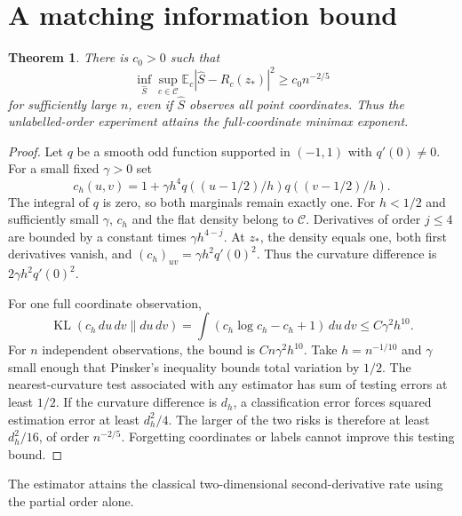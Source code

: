 \documentclass[11pt]{article}
\newtheorem{theorem}{Theorem}[section]
\theoremstyle{remark}
\newcommand{\E}{\mathbb E}
\newcommand{\KL}{\operatorname{KL}}
\newcommand{\calC}{\mathcal C}
\numberwithin{equation}{section}
\begin{document}
\section{A matching information bound}
\begin{theorem}\label{thm:lower}
There is $c_0>0$ such that
\[
 \inf_{\widehat S}\sup_{c\in\calC}
       \E_c|\widehat S-R_c(z_*)|^2\ge c_0n^{-2/5}
\]
for sufficiently large $n$, even if $\widehat S$ observes all point
coordinates. Thus the unlabelled-order experiment attains the
full-coordinate minimax exponent.
\end{theorem}
\begin{proof}
Let $q$ be a smooth odd function supported in $(-1,1)$ with
$q'(0)\ne0$. For a small fixed $\gamma>0$ set
\[
 c_h(u,v)=1+\gamma h^4
          q((u-1/2)/h)q((v-1/2)/h).
\]
The integral of $q$ is zero, so both marginals remain exactly one.
For $h<1/2$ and sufficiently small $\gamma$, $c_h$ and the flat
density belong to $\calC$. Derivatives of order $j\le4$ are
bounded by a constant times $\gamma h^{4-j}$.
At $z_*$, the density equals one, both first derivatives vanish,
and $(c_h)_{uv}=\gamma h^2q'(0)^2$.
Thus the curvature difference is $2\gamma h^2q'(0)^2$.

For one full coordinate observation,
\[
 \KL(c_h\,du\,dv\|du\,dv)
 =\int(c_h\log c_h-c_h+1)\,du\,dv\le C\gamma^2h^{10}.
\]
For $n$ independent observations, the bound is $Cn\gamma^2h^{10}$.
Take $h=n^{-1/10}$ and $\gamma$ small enough that Pinsker's
inequality bounds total variation by $1/2$.
The nearest-curvature test associated with any estimator has sum
of testing errors at least $1/2$.
If the curvature difference is $d_h$, a classification error forces
squared estimation error at least $d_h^2/4$.
The larger of the two risks is therefore at least $d_h^2/16$,
of order $n^{-2/5}$.
Forgetting coordinates or labels cannot improve this testing bound.
\end{proof}

The estimator attains the classical two-dimensional second-derivative
rate using the partial order alone.
\end{document}
